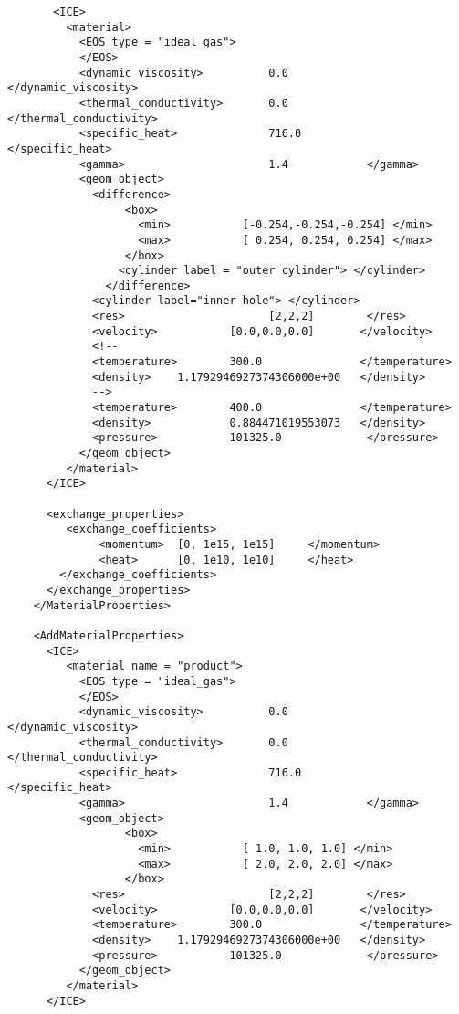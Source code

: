 \begin{verbatim}
       <ICE>
         <material>
           <EOS type = "ideal_gas">
           </EOS>
           <dynamic_viscosity>          0.0            </dynamic_viscosity>
           <thermal_conductivity>       0.0            </thermal_conductivity>
           <specific_heat>              716.0          </specific_heat>
           <gamma>                      1.4            </gamma>
           <geom_object>
             <difference>
                  <box>
                    <min>           [-0.254,-0.254,-0.254] </min>
                    <max>           [ 0.254, 0.254, 0.254] </max>
                  </box>
                 <cylinder label = "outer cylinder"> </cylinder>
               </difference>
             <cylinder label="inner hole"> </cylinder>
             <res>                      [2,2,2]        </res>
             <velocity>           [0.0,0.0,0.0]       </velocity>
             <!--
             <temperature>        300.0               </temperature>
             <density>    1.1792946927374306000e+00   </density>
             -->
             <temperature>        400.0               </temperature>
             <density>            0.884471019553073   </density>
             <pressure>           101325.0             </pressure>
           </geom_object>
         </material>
      </ICE>       

      <exchange_properties>  
         <exchange_coefficients>
              <momentum>  [0, 1e15, 1e15]     </momentum>
              <heat>      [0, 1e10, 1e10]     </heat>
        </exchange_coefficients>
      </exchange_properties> 
    </MaterialProperties>

    <AddMaterialProperties>  
      <ICE>
         <material name = "product">
           <EOS type = "ideal_gas">
           </EOS>
           <dynamic_viscosity>          0.0            </dynamic_viscosity>
           <thermal_conductivity>       0.0            </thermal_conductivity>
           <specific_heat>              716.0          </specific_heat>
           <gamma>                      1.4            </gamma>
           <geom_object>
                  <box>
                    <min>           [ 1.0, 1.0, 1.0] </min>
                    <max>           [ 2.0, 2.0, 2.0] </max>
                  </box>
             <res>                      [2,2,2]        </res>
             <velocity>           [0.0,0.0,0.0]       </velocity>
             <temperature>        300.0               </temperature>
             <density>    1.1792946927374306000e+00   </density>
             <pressure>           101325.0             </pressure>
           </geom_object>
         </material>
      </ICE>


\end{verbatim}
